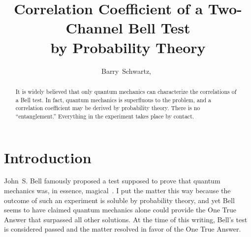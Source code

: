 \documentclass[9pt,technote]{IEEEtran}
\begin{document}
\title{Correlation Coefficient of a Two-Channel Bell Test\\by
  Probability Theory}
\author{Barry~Schwartz,~}

\maketitle
\insert{}

\begin{abstract}
  It is widely believed that only quantum mechanics can characterize
  the correlations of a Bell test. In fact, quantum mechanics is
  superfluous to the problem, and a correlation coefficient may be
  derived by probability theory. There is no ``entanglement.''
  Everything in the experiment takes place by contact.
\end{abstract}

\section{Introduction}

John~S. Bell famously proposed a test supposed to prove that quantum
mechanics was, in essence, magical~\cite{enwiki:1174875317}. I put the
matter this way because the outcome of such an experiment is soluble by
probability theory, and yet Bell seems to have claimed quantum
mechanics alone could provide the One True Answer that surpassed all
other solutions. At the time of this writing, Bell's test is
considered passed and the matter resolved in favor of the One True
Answer.
\end{document}
